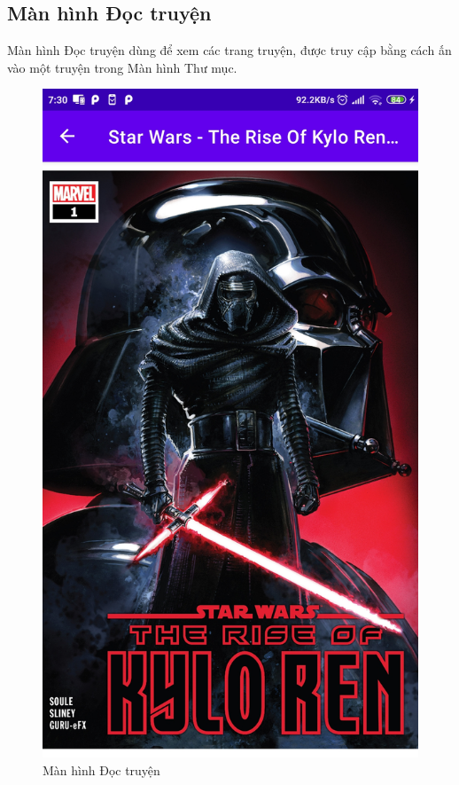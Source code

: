 \documentclass[../../thesis]{subfiles}
\begin{document}
\subsection{Màn hình Đọc truyện}

Màn hình Đọc truyện dùng để xem các trang truyện, được truy cập bằng cách ấn vào
một truyện trong Màn hình Thư mục.

\begin{figure}[H]
    \centering
    \includegraphics[scale=0.12]{../images/Screenshot_2021-05-25-07-30-56-357_com.uet.nvmnghia.yacv}
    \caption{Màn hình Đọc truyện}
    \label{fig:reader_screen}
\end{figure}
\end{document}
